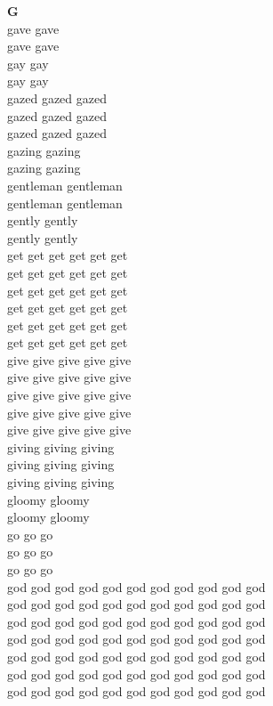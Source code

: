 \vspace{14pt}
\noindent\textbf{\Large G}\\[+12pt]
gave gave\\
gave gave\\
gay gay\\
gay gay\\
gazed gazed gazed\\
gazed gazed gazed\\
gazed gazed gazed\\
gazing gazing\\
gazing gazing\\
gentleman gentleman\\
gentleman gentleman\\
gently gently\\
gently gently\\
get get get get get get\\
get get get get get get\\
get get get get get get\\
get get get get get get\\
get get get get get get\\
get get get get get get\\
give give give give give\\
give give give give give\\
give give give give give\\
give give give give give\\
give give give give give\\
giving giving giving\\
giving giving giving\\
giving giving giving\\
gloomy gloomy\\
gloomy gloomy\\
go go go\\
go go go\\
go go go\\
god god god god god god god god god god god\\
god god god god god god god god god god god\\
god god god god god god god god god god god\\
god god god god god god god god god god god\\
god god god god god god god god god god god\\
god god god god god god god god god god god\\
god god god god god god god god god god god\\
